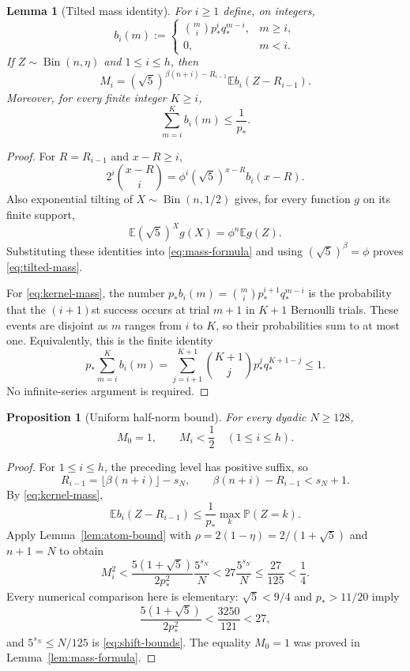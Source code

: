 \documentclass[11pt]{article}
\newtheorem{proposition}[theorem]{Proposition}
\newtheorem{lemma}[theorem]{Lemma}
\theoremstyle{definition}
\theoremstyle{remark}
\newcommand{\E}{\mathbb E}
\newcommand{\Prb}{\mathbb P}
\begin{document}
\begin{lemma}[Tilted mass identity]\label{lem:tilted-mass}
For $i\ge1$ define, on integers,
\[
 b_i(m):=
 \begin{cases}
 \binom mi p_*^i q_*^{m-i},&m\ge i,\\
 0,&m<i.
 \end{cases}
\]
If $Z\sim\operatorname{Bin}(n,\eta)$ and $1\le i\le h$, then
\begin{equation}\label{eq:tilted-mass}
 M_i=(\sqrt5)^{\beta(n+i)-R_{i-1}}
          \E b_i(Z-R_{i-1}).
\end{equation}
Moreover, for every finite integer $K\ge i$,
\begin{equation}\label{eq:kernel-mass}
 \sum_{m=i}^{K}b_i(m)\le\frac1{p_*}.
\end{equation}
\end{lemma}
\begin{proof}
For $R=R_{i-1}$ and $x-R\ge i$,
\[
 2^i\binom{x-R}{i}
 =\phi^i(\sqrt5)^{x-R}b_i(x-R).
\]
Also exponential tilting of $X\sim\operatorname{Bin}(n,1/2)$ gives,
for every function $g$ on its finite support,
\[
 \E(\sqrt5)^Xg(X)=\phi^n\E g(Z).
\]
Substituting these identities into \eqref{eq:mass-formula} and using
$(\sqrt5)^\beta=\phi$ proves \eqref{eq:tilted-mass}.

For \eqref{eq:kernel-mass}, the number
$p_*b_i(m)=\binom mi p_*^{i+1}q_*^{m-i}$ is the probability that the
$(i+1)$st success occurs at trial $m+1$ in $K+1$ Bernoulli trials.
These events are disjoint as $m$ ranges from $i$ to $K$, so their
probabilities sum to at most one. Equivalently, this is the finite identity
\[
 p_*\sum_{m=i}^{K}b_i(m)
 =\sum_{j=i+1}^{K+1}\binom{K+1}{j}p_*^j q_*^{K+1-j}\le1.
\]
No infinite-series argument is required.
\end{proof}

\begin{proposition}[Uniform half-norm bound]\label{prop:digit-norms}
For every dyadic $N\ge128$,
\begin{equation}\label{eq:half-norm}
 M_0=1,\qquad M_i<\frac12\quad(1\le i\le h).
\end{equation}
\end{proposition}
\begin{proof}
For $1\le i\le h$, the preceding level has positive suffix, so
\[
 R_{i-1}=\lfloor\beta(n+i)\rfloor-s_N,
 \qquad \beta(n+i)-R_{i-1}<s_N+1.
\]
By \eqref{eq:kernel-mass},
\[
 \E b_i(Z-R_{i-1})\le\frac1{p_*}\max_k\Prb(Z=k).
\]
Apply Lemma~\ref{lem:atom-bound} with
$\rho=2(1-\eta)=2/(1+\sqrt5)$ and $n+1=N$ to obtain
\begin{equation}\label{eq:mass-square-bound}
 M_i^2<\frac{5(1+\sqrt5)}{2p_*^2}\frac{5^{s_N}}N
       <27\frac{5^{s_N}}N\le\frac{27}{125}<\frac14.
\end{equation}
Every numerical comparison here is elementary: $\sqrt5<9/4$ and
$p_*>11/20$ imply
\[
 \frac{5(1+\sqrt5)}{2p_*^2}<\frac{3250}{121}<27,
\]
and $5^{s_N}\le N/125$ is \eqref{eq:shift-bounds}.
The equality $M_0=1$ was proved in Lemma~\ref{lem:mass-formula}.
\end{proof}
\end{document}

